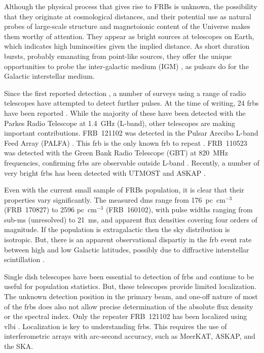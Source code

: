 \documentclass[a4paper,fleqn,usenatbib]{mnras}
\begin{document}
Although the physical process that gives rise to FRBs is unknown, the
possibility that they originate at cosmological distances, and their potential
use as natural probes of large-scale structure and magnetoionic content of the
Universe makes them worthy of attention. They appear as bright sources at
telescopes on Earth, which indicates high luminosities given the implied
distance.  As short duration bursts, probably emanating from point-like sources,
they offer the unique opportunities to probe the inter-galactic medium (IGM)
\citep{2013ApJ...776..125M}, as pulsars do for the Galactic interstellar medium.

Since the first reported detection \citep{2007Sci...318..777L}, a number of
surveys using a range of radio telescopes have attempted to detect further
pulses. At the time of writing, 24 \glspl{frb} have been reported \citep[for an
up-to-date list, see][]{2016PASA...33...45P}. While the majority of these have
been detected with the Parkes Radio Telescope at 1.4~GHz (L-band), other
telescopes are making important contributions. FRB~121102 was detected in the
Pulsar Arecibo L-band Feed Array (PALFA) \citep{2014ApJ...790..101S}. This
\gls{frb} is the only known \gls{frb} to repeat \citep{2016ApJ...833..177S}.
FRB~110523 was detected with the Green Bank Radio Telescope (GBT) at 820~MHz
frequencies, confirming \glspl{frb} are observable outside L-band
\citep{2015Natur.528..523M}.  Recently, a number of very bright \glspl{frb} has
been detected with UTMOST \citep{2017MNRAS.468.3746C,atel10697} and ASKAP
\citep{2017ApJ...841L..12B}.


Even with the current small sample of FRBs population, it is clear that their
properties vary significantly. The measured \glspl{dm} range from
176~pc~cm$^{-3}$ (FRB~170827) to 2596 pc~cm$^{-3}$ (FRB~160102), with pulse
widths ranging from sub-ms (unresolved) to 21~ms, and apparent flux densities
covering four orders of magnitude.  If the population is extragalactic then the
sky distribution is isotropic.  But, there is an apparent observational
dispartiy in the \gls{frb} event rate between high and low Galactic latitudes,
possibly due to diffractive interstellar scintillation
\cite{2015MNRAS.451.3278M}.

Single dish telescopes have been essential to detection of \glspl{frb} and
continue to be useful for population statistics.  But, these telescopes provide
limited localization.  The unknown detection position in the primary beam, and
one-off nature of most of the \glspl{frb} does also not allow precise
determination of the absolute flux density or the spectral index. Only the
repeater FRB~121102 has been localized using \gls{vlbi}
\citep{2017ApJ...834L...8M, 2017ApJ...834L...7T}. Localization is key to
understanding \glspl{frb}. This requires the use of interferometric arrays with
arc-second accuracy, such as MeerKAT, ASKAP, and the SKA. 
\end{document}
